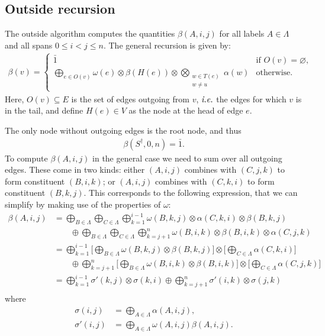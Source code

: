 \subsection{Outside recursion}
  The outside algorithm computes the quantities $\beta(A,i,j)$ for all labels $A \in \Lambda$ and all spans $0 \leq i < j \leq n$. The general recursion is given by:
  \begin{align*}
    \beta(v) =
      \begin{cases}
        \bar{1}  & \mbox{if } O(v) = \varnothing, \\
        \displaystyle\bigoplus_{e \in O(v)} \omega(e) \otimes \beta(H(e)) \otimes \displaystyle\bigotimes_{ \substack{ w \in T(e) \\ w \neq u } } \alpha(w)  & \mbox{otherwise.}
      \end{cases}
  \end{align*}
  Here, $O(v) \subseteq E$ is the set of edges outgoing from $v$, $\emph{i.e.}$ the edges for which $v$ is in the tail, and define $H(e) \in V$ as the node at the head of edge $e$.

  The only node without outgoing edges is the root node, and thus
  \begin{align*}
    \beta(S^{\dagger}, 0, n) = \bar{1}.
  \end{align*}
  To compute $\beta(A, i, j)$ in the general case we need to sum over all outgoing edges. These come in two kinds: either $(A, i, j)$ combines with $(C, j, k)$ to form constituent $(B, i, k)$; or $(A, i, j)$ combines with $(C, k, i)$ to form constituent $(B, k, j)$. This corresponds to the following expression, that we can simplify by making use of the properties of $\omega$:
  \begin{align*}
    \beta(A, i, j)
      &= \bigoplus_{B \in \Lambda} \bigoplus_{C \in \Lambda} \bigoplus_{k=1}^{i-1} \omega(B, k, j) \otimes \alpha(C, k, i) \otimes \beta(B, k, j) \\
        &\qquad \oplus \bigoplus_{B \in \Lambda} \bigoplus_{C \in \Lambda} \bigoplus_{k=j+1}^{n} \omega(B, i, k) \otimes \beta(B, i, k) \otimes \alpha(C, j, k) \\
      &=  \bigoplus_{k=1}^{i-1}  \Bigg[ \bigoplus_{B \in \Lambda} \omega(B, k, j)  \otimes \beta(B, k, j) \Bigg] \otimes \Bigg[ \bigoplus_{C \in \Lambda} \alpha(C, k, i) \Bigg] \\
        &\qquad \oplus \bigoplus_{k=j+1}^{n}  \Bigg[ \bigoplus_{B \in \Lambda}  \omega(B, i, k) \otimes \beta(B, i, k) \Bigg] \otimes  \Bigg[  \bigoplus_{C \in \Lambda} \alpha(C, j, k) \Bigg] \\
      &=  \bigoplus_{k=1}^{i-1}  \sigma'(k, j) \otimes \sigma(k, i) \oplus \bigoplus_{k=j+1}^{n} \sigma'(i, k) \otimes  \sigma(j, k) \\
  \end{align*}
  where
  \begin{align*}
      \sigma(i, j) &= \bigoplus_{A \in \Lambda} \alpha(A, i, j),  \\
      \sigma'(i, j) &= \bigoplus_{A \in \Lambda} \omega(A, i, j) \beta(A, i, j).
  \end{align*}

